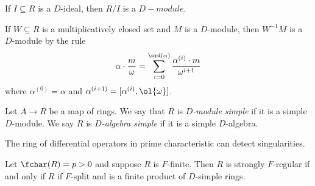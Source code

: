 \begin{example}\label{ex:quotient-is-d-mod}
	If $I \subseteq R$ is a $D$-ideal, then $R/I$ is a $D-module$.
\end{example}

\begin{prop}\label{prop:localization-of-D-mod}
	If $W \subseteq R$ is a multiplicatively closed set and $M$ is a $D$-module, then $W^{-1}M$ is a $D$-module by the rule
	\begin{align*}
		\alpha\cdot \frac{m}{\omega} = \sum_{i = 0}^{\ord(\alpha)} \frac{\alpha^{(i)}\cdot m}{\omega^{i+1}}
	\end{align*}
	where $\alpha^{(0)} = \alpha$ and $\alpha^{(i+1)} = [\alpha^{(i)}, \ol{\omega}]$.
\end{prop}

\begin{defn}\label{defn:D-module-simple}
	Let $A\to R$ be a map of rings. We say that $R$ is \emph{$D$-module simple} if it is a simple $D$-module. We say $R$ is \emph{$D$-algebra simple} if it is a simple $D$-algebra.
\end{defn}

The ring of differential operators in prime characteristic can detect singularities. 

\begin{thm}\label{thm:strongly-F-regular-rings-D-simple}
	Let $\fchar(R) = p > 0$ and suppose $R$ is $F$-finite. Then $R$ is strongly $F$-regular if and only if $R$ if $F$-split and is a finite product of $D$-simple rings.
\end{thm}

\newpage
\printbibliography

